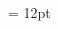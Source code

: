 \documentclass[a4paper,twoside]{article}
\begin{document}
\begin{multicols}{2}
\begin{spacing}{0.5}{\raggedright}
\begin{spacing}{0.5}{\raggedright} 
\spanheadwordminorentryvariantletDatadicBody{ }\spanvisiblevariantentryrefsminorentryvariantletDatadicBody{ \{} \spanspanmxbheadwordreferencedentryreferencedentriesvisiblevariantentryrefvisiblevariantentryrefsminorentryvariantletDatadicBody{ } \spanvisiblevariantentryrefsminorentryvariantletDatadicBody{\} }\spanspanessummarydefinitionminorentryvariantletDatadicBody{ }  \end{spacing}
\begin{spacing}{0.5}{\raggedright} 
\spanheadwordminorentryvariantletDatadicBody{ }\spanvisiblevariantentryrefsminorentryvariantletDatadicBody{ \{} \spanspanmxbheadwordreferencedentryreferencedentriesvisiblevariantentryrefvisiblevariantentryrefsminorentryvariantletDatadicBody{ } \spanvisiblevariantentryrefsminorentryvariantletDatadicBody{\} }\spanspanessummarydefinitionminorentryvariantletDatadicBody{ }  \end{spacing}
\begin{spacing}{0.5}
\hangindent= 12pt

\end{spacing}
\end{spacing}
\end{multicols}
\end{document}
